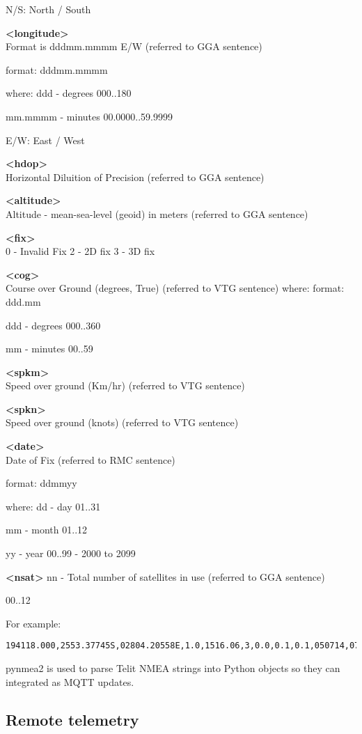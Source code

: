 N/S: North / South 

\textbf{<longitude>} \\
Format is dddmm.mmmm E/W (referred to GGA sentence) 

format:
dddmm.mmmm

where:
ddd - degrees						
000..180

mm.mmmm - minutes				
00.0000..59.9999

E/W: East / West

\textbf{<hdop>} \\
Horizontal Diluition of Precision (referred to GGA sentence) 

\textbf{<altitude>} \\
Altitude - mean-sea-level (geoid) in meters (referred to GGA sentence)

\textbf{<fix>} \\
0 - Invalid Fix
2 - 2D fix
3 - 3D fix

\textbf{<cog>} \\
Course over Ground (degrees, True) (referred to VTG sentence) where:
format:
ddd.mm

ddd - degrees		 	 	 		
000..360

mm - minutes						
00..59


\textbf{<spkm>}\\
Speed over ground (Km/hr) (referred to VTG sentence)

\textbf{<spkn>} \\
Speed over ground (knots) (referred to VTG sentence)

\textbf{<date>} \\
Date of Fix (referred to RMC sentence)

format:
ddmmyy 
						
where:
dd - day					
01..31

mm - month					
01..12

yy - year						
00..99 - 2000 to 2099

\textbf{<nsat>}
nn - Total number of satellites in use (referred to GGA sentence)
						
00..12

For example:
\begin{lstlisting}
194118.000,2553.37745S,02804.20558E,1.0,1516.06,3,0.0,0.1,0.1,050714,07
\end{lstlisting}

pynmea2 is used to parse Telit NMEA strings into Python objects so they can integrated as MQTT updates.

\subsection{Remote telemetry}

